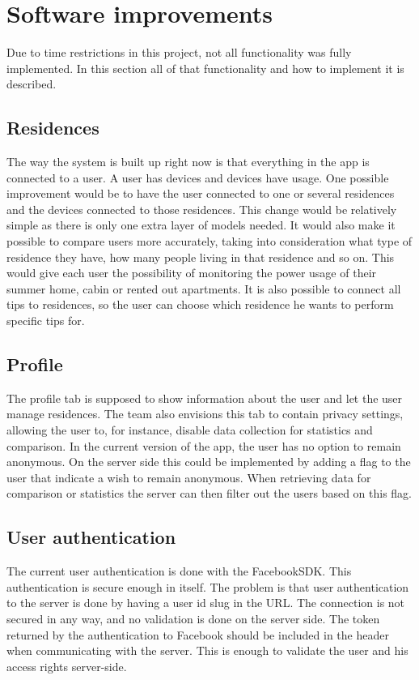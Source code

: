 \section{Software improvements}
Due to time restrictions in this project, not all functionality was fully implemented. In this section all of that functionality and how to implement it is described. 

\subsection{Residences}
The way the system is built up right now is that everything in the app is connected to a user. A user has devices and devices have usage. One possible improvement would be to have the user connected to one or several residences and the devices connected to those residences. This change would be relatively simple as there is only one extra layer of models needed. It would also make it possible to compare users more accurately, taking into consideration what type of residence they have, how many people living in that residence and so on. This would give each user the possibility of monitoring the power usage of their summer home, cabin or rented out apartments. It is also possible to connect all tips to residences, so the user can choose which residence he wants to perform specific tips for. 

\subsection{Profile}
The profile tab is supposed to show information about the user and let the user manage residences. The team also envisions this tab to contain privacy settings, allowing the user to, for instance, disable data collection for statistics and comparison. In the current version of the app, the user has no option to remain anonymous. 
On the server side this could be implemented by adding a flag to the user that indicate a wish to remain anonymous. When retrieving data for comparison or statistics the server can then filter out the users based on this flag.

\subsection{User authentication}
The current user authentication is done with the FacebookSDK. This authentication is secure enough in itself. 
The problem is that user authentication to the server is done by having a user id \gls{slug} in the URL. The connection is not secured in any way, and no validation is done on the server side.
The token returned by the authentication to Facebook should be included in the header when communicating with the server. This is enough to validate the user and his access rights server-side.

